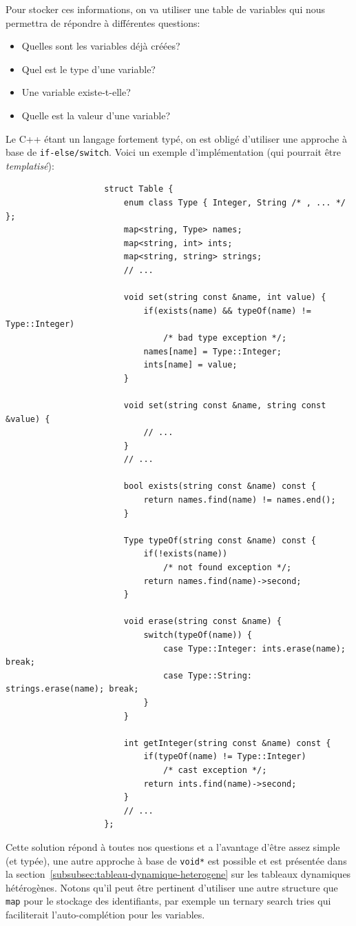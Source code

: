 \documentclass[french]{article}
\begin{document}
		Pour stocker ces informations, on va utiliser une table de variables qui nous permettra de répondre à différentes questions:
		
		\begin{itemize}
			\item Quelles sont les variables déjà créées?
			\item Quel est le type d'une variable?
			\item Une variable existe-t-elle?
			\item Quelle est la valeur d'une variable?
		\end{itemize}
		
		Le C++ étant un langage fortement typé, on est obligé d'utiliser une approche à base de \texttt{if-else/switch}. Voici un exemple d'implémentation (qui pourrait être \textit{templatisé}):
		
		\begin{lstlisting}
					struct Table {
						enum class Type { Integer, String /* , ... */ };
						map<string, Type> names;
						map<string, int> ints;
						map<string, string> strings;
						// ...
						
						void set(string const &name, int value) {
							if(exists(name) && typeOf(name) != Type::Integer)
								/* bad type exception */;
							names[name] = Type::Integer;
							ints[name] = value;
						}
						
						void set(string const &name, string const &value) {
							// ...
						}
						// ...
						
						bool exists(string const &name) const {
							return names.find(name) != names.end();
						}
						
						Type typeOf(string const &name) const {
							if(!exists(name))
								/* not found exception */;
							return names.find(name)->second;
						}
						
						void erase(string const &name) {
							switch(typeOf(name)) {
								case Type::Integer: ints.erase(name); break;
								case Type::String: strings.erase(name); break;
							}
						}
						
						int getInteger(string const &name) const {
							if(typeOf(name) != Type::Integer)
								/* cast exception */;
							return ints.find(name)->second;
						}
						// ...
					};
		\end{lstlisting}
		
		Cette solution répond à toutes nos questions et a l'avantage d'être assez simple (et typée), une autre approche à base de \texttt{void*} est possible et est présentée dans la section~\ref{subsubsec:tableau-dynamique-heterogene} sur les tableaux dynamiques hétérogènes. Notons qu'il peut être pertinent d'utiliser une autre structure que \texttt{map} pour le stockage des identifiants, par exemple un ternary search tries qui faciliterait l'auto-complétion pour les variables.
		
\end{document}
